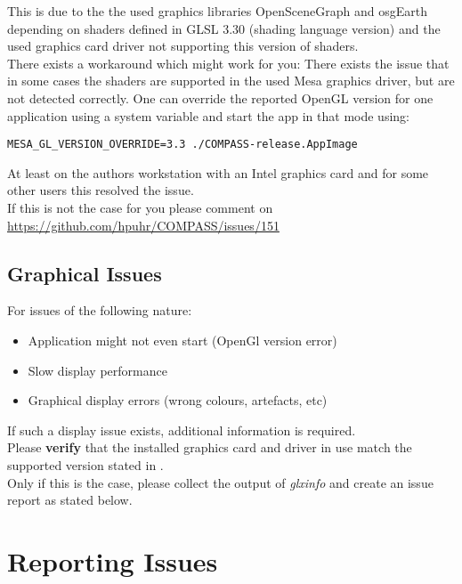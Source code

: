 This is due to the the used graphics libraries OpenSceneGraph and osgEarth depending on shaders defined in GLSL 3.30 (shading language version) and the used graphics card driver not supporting this version of shaders. \\

There exists a workaround which might work for you: There exists the issue that in some cases the shaders are supported in the used Mesa graphics driver, but are not detected correctly. One can override the reported OpenGL version for one application using a system variable and start the app in that mode using:

\begin{lstlisting}
MESA_GL_VERSION_OVERRIDE=3.3 ./COMPASS-release.AppImage
\end{lstlisting}

At least on the authors workstation with an Intel graphics card and for some other users this resolved the issue. \\

If this is not the case for you please comment on \url{https://github.com/hpuhr/COMPASS/issues/151}

\subsection{Graphical Issues}

For issues of the following nature:

\begin{itemize} 
\item Application might not even start (OpenGl version error)
\item Slow display performance
\item Graphical display errors (wrong colours, artefacts, etc) 
\end{itemize} 

If such a display issue exists, additional information is required. \\

Please \textbf{verify} that the installed graphics card and driver in use match the supported version stated in . \\

Only if this is the case, please collect the output of \textit{glxinfo} and create an issue report as stated below.

\section{Reporting Issues}

